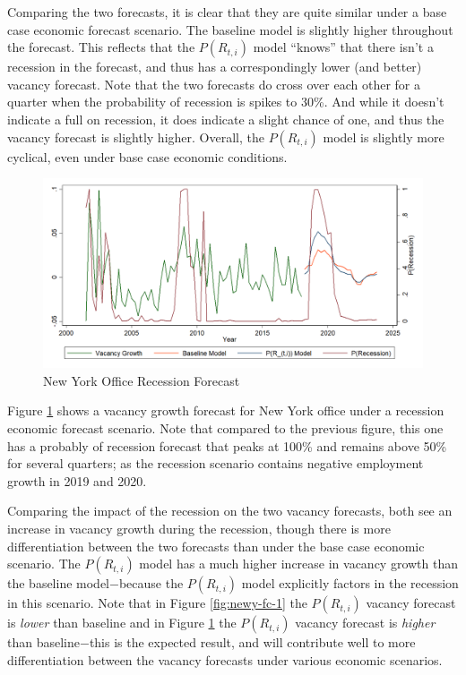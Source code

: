 \documentclass[10pt]{article}
\begin{document}
Comparing the two forecasts, it is clear that they are quite similar under a base case economic forecast scenario.  The baseline model is slightly higher throughout the forecast.  This reflects that the $P(R_{t,i})$ model ``knows'' that there isn't a recession in the forecast, and thus has a correspondingly lower (and better) vacancy forecast.  Note that the two forecasts do cross over each other for a quarter when the probability of recession is spikes to 30\%.  And while it doesn't indicate a full on recession, it does indicate a slight chance of one, and thus the vacancy forecast is slightly higher.  Overall, the $P(R_{t,i})$ model is slightly more cyclical, even under base case economic conditions.

\begin{figure}[h]
\begin{center}
\caption{New York Office Recession Forecast} \label{fig:newy-fc-5}
\includegraphics[scale=0.22]{newyoff-forecast-simid5-2.png}
\end{center}
\end{figure}

Figure \ref{fig:newy-fc-5} shows a vacancy growth forecast for New York office under a recession economic forecast scenario.  Note that compared to the previous figure, this one has a probably of recession forecast that peaks at 100\% and remains above 50\% for several quarters; as the recession scenario contains negative employment growth in 2019 and 2020.

Comparing the impact of the recession on the two vacancy forecasts, both see an increase in vacancy growth during the recession, though there is more differentiation between the two forecasts than under the base case economic scenario.  The $P(R_{t,i})$ model has a much higher increase in vacancy growth than the baseline model$-$because the $P(R_{t,i})$ model explicitly factors in the recession in this scenario.  Note that in Figure \ref{fig:newy-fc-1} the $P(R_{t,i})$ vacancy forecast is \emph{lower} than baseline and in Figure \ref{fig:newy-fc-5} the $P(R_{t,i})$ vacancy forecast is \emph{higher} than baseline$-$this is the expected result, and will contribute well to more differentiation between the vacancy forecasts under various economic scenarios.
\end{document}
